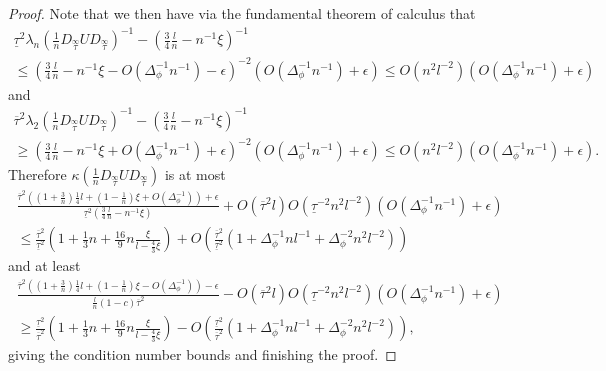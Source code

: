 \documentclass[twoside,11pt]{article}
\newcommand{\limiting}[1]{\overset{\scriptscriptstyle\infty}{#1}}
\begin{document}
\begin{proof}
Note that we then have via the fundamental theorem of calculus that
\begin{multline*}
\underline{\tau}^2 \lambda_n\left( \frac{1}{n} D_{\limiting{\tau}} U D_{\limiting{\tau}} \right)^{-1} - \left( \frac{3}{4} \frac{l}{n} - n^{-1} \xi \right)^{-1} \\
\leq \left( \frac{3}{4} \frac{l}{n} - n^{-1} \xi - O(\Delta_\phi^{-1} n^{-1}) - \epsilon \right)^{-2} (O(\Delta_\phi^{-1} n^{-1}) + \epsilon) 
\leq O(n^2 l^{-2}) (O(\Delta_\phi^{-1} n^{-1}) + \epsilon) 
\end{multline*}
and
\begin{multline*}
\overline{\tau}^2 \lambda_2\left( \frac{1}{n} D_{\limiting{\tau}} U D_{\limiting{\tau}} \right)^{-1} - \left( \frac{3}{4} \frac{l}{n} - n^{-1} \xi \right)^{-1} \\
\geq \left( \frac{3}{4} \frac{l}{n} - n^{-1} \xi + O(\Delta_\phi^{-1} n^{-1}) + \epsilon \right)^{-2} (O(\Delta_\phi^{-1} n^{-1}) + \epsilon)
\leq O(n^2 l^{-2}) (O(\Delta_\phi^{-1} n^{-1}) + \epsilon).
\end{multline*}
Therefore $\kappa\left( \frac{1}{n} D_{\limiting{\tau}} U D_{\limiting{\tau}} \right)$ is at most
\begin{multline*}
\frac{\overline{\tau}^2 \left( \left( 1 + \frac{3}{n} \right) \frac{1}{4} l + \left( 1 - \frac{1}{n} \right) \xi + O(\Delta_\phi^{-1}) \right) + \epsilon}{\underline{\tau}^2 (\frac{3}{4} \frac{l}{n} - n^{-1} \xi)} + O(\overline{\tau}^2 l) O(\underline{\tau}^{-2} n^2 l^{-2}) (O(\Delta_\phi^{-1} n^{-1}) + \epsilon) \\
\leq \frac{\overline{\tau}^2}{\underline{\tau}^2} \left( 1 + \frac{1}{3} n + \frac{16}{9} n \frac{\xi}{l - \frac{4}{3} \xi} \right) + O\left( \frac{\overline{\tau}^2}{\underline{\tau}^2} \left( 1 + \Delta_\phi^{-1} n l^{-1} + \Delta_\phi^{-2} n^2 l^{-2} \right) \right)
\end{multline*}
and at least
\begin{multline*}
\frac{\overline{\tau}^2 \left( \left( 1 + \frac{3}{n} \right) \frac{1}{4} l + \left( 1 - \frac{1}{n} \right) \xi - O(\Delta_\phi^{-1}) \right) - \epsilon}{\frac{l}{n} (1-c) \overline{\tau}^2} - O(\overline{\tau}^2 l) O(\underline{\tau}^{-2} n^2 l^{-2}) (O(\Delta_\phi^{-1} n^{-1}) + \epsilon) \\
\geq \frac{\underline{\tau}^2}{\overline{\tau}^2} \left( 1 + \frac{1}{3} n + \frac{16}{9} n \frac{\xi}{l - \frac{4}{3} \xi} \right) - O\left( \frac{\underline{\tau}^2}{\overline{\tau}^2} \left( 1 + \Delta_\phi^{-1} n l^{-1} + \Delta_\phi^{-2} n^2 l^{-2} \right) \right),
\end{multline*}
giving the condition number bounds and finishing the proof.
\end{proof}
\end{document}

